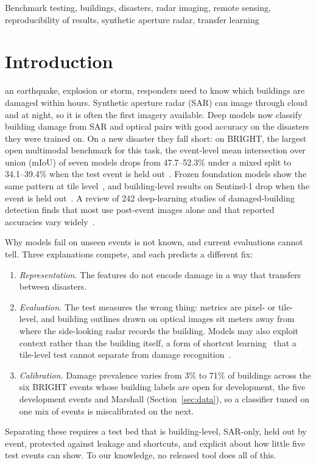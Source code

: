 \documentclass[journal]{IEEEtran}
\begin{document}
\begin{IEEEkeywords}
Benchmark testing, buildings, disasters, radar imaging, remote sensing, reproducibility of results, synthetic aperture radar, transfer learning
\end{IEEEkeywords}


\section{Introduction}
\label{sec:introduction}
 an earthquake, explosion or storm, responders need to know which buildings are damaged within hours. Synthetic aperture radar (SAR) can image through cloud and at night, so it is often the first imagery available. Deep models now classify building damage from SAR and optical pairs with good accuracy on the disasters they were trained on. On a new disaster they fall short: on BRIGHT, the largest open multimodal benchmark for this task, the event-level mean intersection over union (mIoU) of seven models drops from 47.7--52.3\% under a mixed split to 34.1--39.4\% when the test event is held out~\cite{chen2025bright}. Frozen foundation models show the same pattern at tile level~\cite{shibli2026shortcut}, and building-level results on Sentinel-1 drop when the event is held out~\cite{currie2026transfer}. A review of 242 deep-learning studies of damaged-building detection finds that most use post-event images alone and that reported accuracies vary widely~\cite{wang2024review}.

Why models fail on unseen events is not known, and current evaluations cannot tell. Three explanations compete, and each predicts a different fix:
\begin{enumerate}
\item \emph{Representation.} The features do not encode damage in a way that transfers between disasters.
\item \emph{Evaluation.} The test measures the wrong thing: metrics are pixel- or tile-level, and building outlines drawn on optical images sit meters away from where the side-looking radar records the building. Models may also exploit context rather than the building itself, a form of shortcut learning~\cite{geirhos2020shortcut} that a tile-level test cannot separate from damage recognition~\cite{shibli2026shortcut}.
\item \emph{Calibration.} Damage prevalence varies from 3\% to 71\% of buildings across the six BRIGHT events whose building labels are open for development, the five development events and Marshall (Section~\ref{sec:data}), so a classifier tuned on one mix of events is miscalibrated on the next.
\end{enumerate}
Separating these requires a test bed that is building-level, SAR-only, held out by event, protected against leakage and shortcuts, and explicit about how little five test events can show. To our knowledge, no released tool does all of this.
\end{document}
